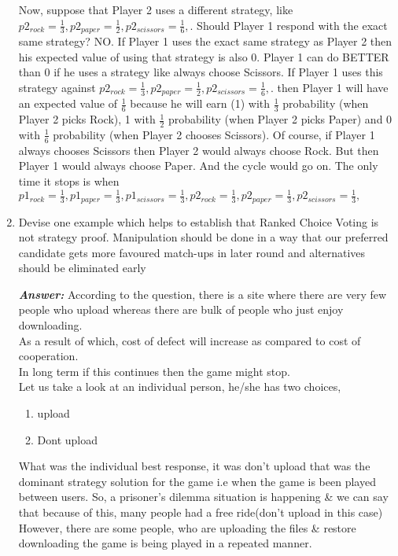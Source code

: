 \documentclass[15pt]{article}
\begin{document}
\begin{enumerate}
Now, suppose that Player 2 uses a different strategy, like $p2_{rock}=\frac{1}{3}, p2_{paper}=\frac{1}{2}, p2_{scissors}=\frac{1}{6},$.
Should Player 1 respond with the exact same strategy? NO. If Player 1 uses the exact same strategy as
Player 2 then his expected value of using that strategy is also 0. Player 1 can do BETTER than 0 if he uses
a strategy like always choose Scissors. If Player 1 uses this strategy against $p2_{rock}=\frac{1}{3}, p2_{paper}=\frac{1}{2}, p2_{scissors}=\frac{1}{6},$.
then Player 1 will have an expected value of $\frac{1}{6}$
because he will earn (1) with $\frac{1}{3}$ probability
(when Player 2 picks Rock), 1 with $\frac{1}{2}$ probability (when Player 2 picks Paper) and 0 with $\frac{1}{6}$ probability
(when Player 2 chooses Scissors). Of course, if Player 1 always chooses Scissors then Player 2 would always choose Rock. But then Player 1 would always choose Paper. And the cycle would go on. The only time it stops is when $p1_{rock}=\frac{1}{3}, p1_{paper}=\frac{1}{3}, p1_{scissors}=\frac{1}{3}, p2_{rock}=\frac{1}{3}, p2_{paper}=\frac{1}{3}, p2_{scissors}=\frac{1}{3},$

\item Devise one example which helps to establish that Ranked Choice Voting is not strategy proof. Manipulation should be done in a way that our preferred candidate gets more favoured match-ups in later round and alternatives should be eliminated early

\textbf{\emph{Answer: }}According to the question, there is a site where there are very few people who upload whereas there are bulk of people who just enjoy downloading.\\

As a result of which, cost of defect will increase as compared to cost of cooperation.\\
In long term if this continues then the game might stop.\\
Let us take a look at an individual person, he/she has two choices,
\begin{enumerate}
\item upload
\item Dont upload
\end{enumerate}

What was the individual best response, it was don't upload that was the dominant strategy solution for the game i.e when the game is been played between users.
So, a prisoner's dilemma situation is happening \& we can say that because of this, many people had a free ride(don't upload in this case)
However, there are some people, who are uploading the files \& restore downloading the game is being played in a repeated manner.


\end{enumerate}
\end{document}
